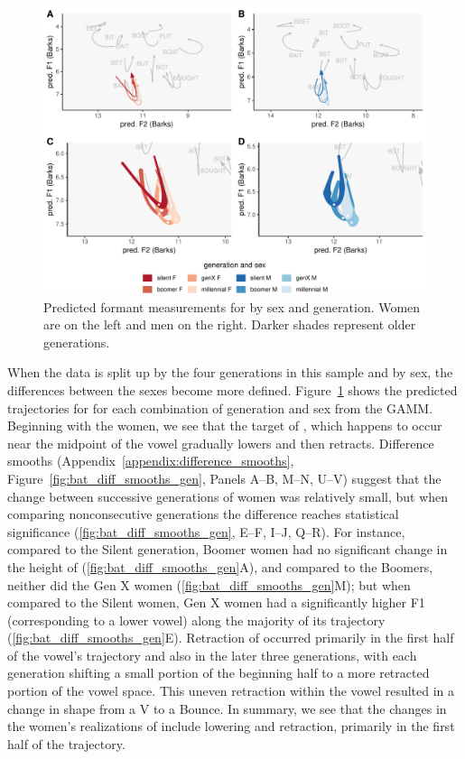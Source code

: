 \begin{figure}[tb!]
	\centering
	\includegraphics[width = 6.5in]{Figures/BAT/BAT_four_panel_plot.pdf}
	\caption[Predicted formant measurements for \bat by sex and generation.]{Predicted formant measurements for \bat by sex and generation. Women are on the left and men on the right. Darker shades represent older generations.}
	\label{fig:BAT_four_panel}
\end{figure}

When the data is split up by the four generations in this sample and by sex, the differences between the sexes become more defined. Figure~\ref{fig:BAT_four_panel} shows the predicted trajectories for \bat for each combination of generation and sex from the GAMM. Beginning with the women, we see that the target of \bat, which happens to occur near the midpoint of the vowel gradually lowers and then retracts. Difference smooths (Appendix~\ref{appendix:difference_smooths}, Figure~\ref{fig:bat_diff_smooths_gen}, Panels A--B, M--N, U--V) suggest that the change between successive generations of women was relatively small, but when comparing nonconsecutive generations the difference reaches statistical significance (\ref{fig:bat_diff_smooths_gen}, E--F, I--J, Q--R). For instance, compared to the Silent generation, Boomer women had no significant change in the height of \bat (\ref{fig:bat_diff_smooths_gen}A), and compared to the Boomers, neither did the Gen X women (\ref{fig:bat_diff_smooths_gen}M); but when compared to the Silent women, Gen X women had a significantly higher F1 (corresponding to a lower vowel) along the majority of its trajectory (\ref{fig:bat_diff_smooths_gen}E). Retraction of \bat occurred primarily in the first half of the vowel's trajectory and also in the later three generations, with each generation shifting a small portion of the beginning half to a more retracted portion of the vowel space. This uneven retraction within the vowel resulted in a change in shape from a V to a Bounce. In summary, we see that the changes in the women's realizations of \bat include lowering and retraction, primarily in the first half of the trajectory.

